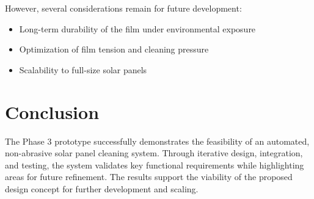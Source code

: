 \documentclass[12pt]{article}
\begin{document}
However, several considerations remain for future development:

\begin{itemize}
    \item Long-term durability of the film under environmental exposure
    \item Optimization of film tension and cleaning pressure
    \item Scalability to full-size solar panels
\end{itemize}

\section{Conclusion}

The Phase 3 prototype successfully demonstrates the feasibility of an automated, non-abrasive solar panel cleaning system. Through iterative design, integration, and testing, the system validates key functional requirements while highlighting areas for future refinement. The results support the viability of the proposed design concept for further development and scaling.
\end{document}
